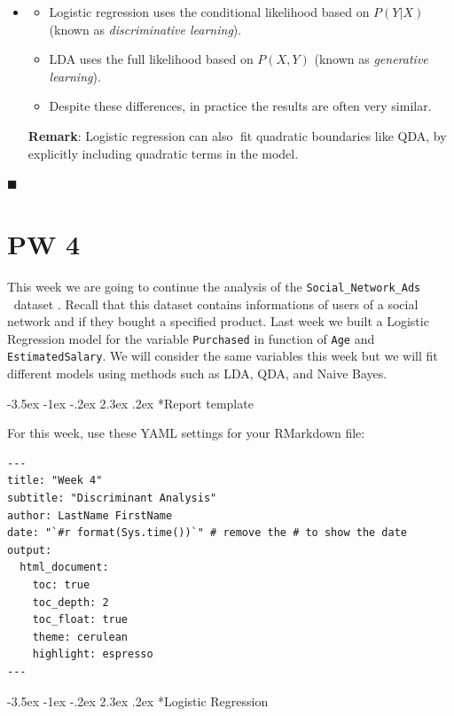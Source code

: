 \documentclass[]{book}
\makeatletter
\providecommand{\tightlist}{%
  \setlength{\itemsep}{0pt}\setlength{\parskip}{0pt}}
\newenvironment{rmdblock}[1]
  {\begin{shaded*}
  \begin{itemize}
  \renewcommand{\labelitemi}{
    \raisebox{-.7\height}[0pt][0pt]{
      {\setkeys{Gin}{width=2em,keepaspectratio}\texttt{[image: img/icons/\#1]}}
    }
  }
  \item
  }
  {
  \end{itemize}
  \end{shaded*}
  }
\newenvironment{rmdinsight}
  {\begin{rmdblock}{insight}}
  {\end{rmdblock}}
\renewcommand\section{\@startsection {section}{1}{\z@}%
                                   {-3.5ex \@plus -1ex \@minus -.2ex}%
                                   {2.3ex \@plus.2ex}%
                                   {\normalfont\Large\bfseries\color{ForestGreen}}}
\theoremstyle{definition}
\theoremstyle{definition}
\theoremstyle{definition}
\theoremstyle{remark}
\makeatother
\begin{document}
\begin{rmdinsight}
\begin{itemize}
\tightlist
\item
  Logistic regression uses the conditional likelihood based on
  \(P(Y|X)\) (known as \emph{discriminative learning}).
\item
  LDA uses the full likelihood based on \(P(X,Y )\) (known as
  \emph{generative learning}).
\item
  Despite these differences, in practice the results are often very
  similar.
\end{itemize}

\textbf{Remark}: Logistic regression can also fit quadratic boundaries
like QDA, by explicitly including quadratic terms in the model.
\end{rmdinsight}

◼

\chapter*{PW 4}\label{pw-4}

This week we are going to continue the analysis of the
\texttt{Social\_Network\_Ads}
\textcolor{white}{[}\faTable\textcolor{white}{]}dataset . Recall that
this dataset contains informations of users of a social network and if
they bought a specified product. Last week we built a Logistic
Regression model for the variable \texttt{Purchased} in function of
\texttt{Age} and \texttt{EstimatedSalary}. We will consider the same
variables this week but we will fit different models using methods such
as LDA, QDA, and Naive Bayes.

\section*{Report template}\label{report-template-1}

For this week, use these YAML settings for your RMarkdown file:

\begin{verbatim}
---
title: "Week 4"
subtitle: "Discriminant Analysis"
author: LastName FirstName
date: "`#r format(Sys.time())`" # remove the # to show the date
output:
  html_document:
    toc: true
    toc_depth: 2
    toc_float: true
    theme: cerulean
    highlight: espresso
---
\end{verbatim}

\section*{Logistic Regression}\label{logistic-regression-2}
\end{document}
